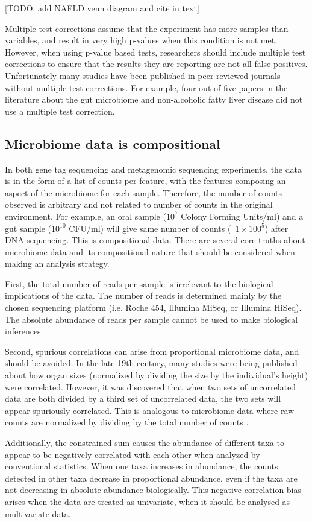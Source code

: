 [TODO: add NAFLD venn diagram and cite in text]

Multiple test corrections assume that the experiment has more samples than variables, and result in very high p-values when this condition is not met. However, when using p-value based tests, researchers should include multiple test corrections to ensure that the results they are reporting are not all false positives. Unfortunately many studies have been published in peer reviewed journals without multiple test corrections. For example, four out of five papers in the literature about the gut microbiome and non-alcoholic fatty liver disease did not use a multiple test correction.

\subsection{Microbiome data is compositional}
In both gene tag sequencing and metagenomic sequencing experiments, the data is in the form of a list of counts per feature, with the features composing an aspect of the microbiome for each sample. Therefore, the number of counts observed is arbitrary and not related to number of counts in the original environment. For example, an oral sample ($10^{7}$ Colony Forming Units/ml) and a gut sample ($10^{10}$ CFU/ml) will give same number of counts (~$1 \times 100^{5}$) after DNA sequencing. This is compositional data. There are several core truths about microbiome data and its compositional nature that should be considered when making an analysis strategy.

First, the total number of reads per sample is irrelevant to the biological implications of the data. The number of reads is determined mainly by the chosen sequencing platform (i.e. Roche 454, Illumina MiSeq, or Illumina HiSeq). The absolute abundance of reads per sample cannot be used to make biological inferences.

Second, spurious correlations can arise from proportional microbiome data, and should be avoided. In the late 19th century, many studies were being published about how organ sizes (normalized by dividing the size by the individual's height) were correlated. However, it was discovered that when two sets of uncorrelated data are both divided by a third set of uncorrelated data, the two sets will appear spuriously correlated. This is analogous to microbiome data where raw counts are normalized by dividing by the total number of counts \cite{pearson1896mathematical}.

Additionally, the constrained sum causes the abundance of different taxa to appear to be negatively correlated with each other when analyzed by conventional statistics. When one taxa increases in abundance, the counts detected in other taxa decrease in proportional abundance, even if the taxa are not decreasing in absolute abundance biologically. This negative correlation bias arises when the data are treated as univariate, when it should be analysed as multivariate data.

